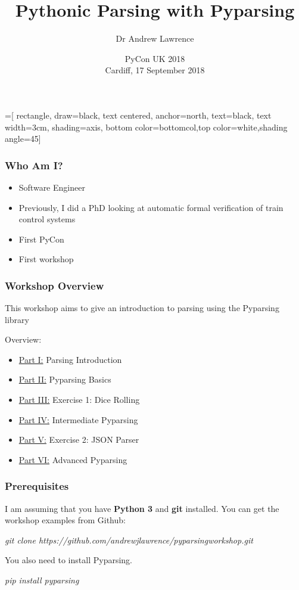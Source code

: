 \documentclass{beamer}
\title[Pythonic Parsing with Pyparsing]{Pythonic Parsing with Pyparsing}
\author[Dr Andrew Lawrence]{Dr Andrew Lawrence}
\date[PyCon UK, 17 September 2018]{PyCon UK 2018\\[1em]  Cardiff, 17 September 2018}
\begin{document}
=[
    rectangle,
    draw=black,
    text centered,
    anchor=north,
    text=black,
    text width=3cm,
    shading=axis,
    bottom color=bottomcol,top color=white,shading angle=45]


\begin{frame}
  \titlepage
\end{frame}

\begin{frame}
\frametitle{Who Am I?}
\begin{itemize}
\item Software Engineer
\pause
\item Previously, I did a PhD looking at automatic formal verification of train control systems
\pause
\item First PyCon
\pause
\item First workshop
\end{itemize}
\end{frame}

\begin{frame}

\frametitle{Workshop Overview}

\medskip
This workshop aims to give an introduction to parsing using the Pyparsing library

\medskip

Overview:

\begin{itemize}
  \item \underline{Part I:} Parsing Introduction
  \item \underline{Part II:} Pyparsing Basics
  \item \underline{Part III:} Exercise 1: Dice Rolling
  \item \underline{Part IV:} Intermediate Pyparsing
  \item \underline{Part V:} Exercise 2: JSON Parser
  \item \underline{Part VI:} Advanced Pyparsing
\end{itemize}
\end{frame}

\begin{frame}

\frametitle{Prerequisites}
I am assuming that you have \textbf{Python 3} and \textbf{git} installed. You can get the workshop examples from Github:
\begin{center}
\textit{git clone https://github.com/andrewjlawrence/pyparsingworkshop.git}
\end{center}
\bigskip
You also need to install Pyparsing. 
\begin{center}
\textit{pip install pyparsing}
\end{center}
\end{frame}
\end{document}
